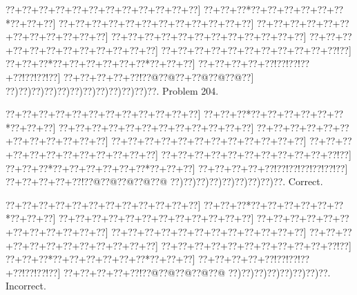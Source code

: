 \documentclass[a5paper]{article}
\begin{document}
\begin{center}
{\goo
\0??+\0??+\0??+\0??+\0??+\0??+\0??+\0??+\0??+\0??+\0??+\0??]
\0??+\0??+\0??*\0??+\0??+\0??+\0??+\0??+\0??*\0??+\0??+\0??]
\0??+\0??+\0??+\0??+\0??+\0??+\0??+\0??+\0??+\0??+\0??+\0??]
\0??+\0??+\0??+\0??+\0??+\0??+\0??+\0??+\0??+\0??+\0??+\0??]
\0??+\0??+\0??+\0??+\0??+\0??+\0??+\0??+\0??+\0??+\0??+\0??]
\0??+\0??+\0??+\0??+\0??+\0??+\0??+\0??+\0??+\0??+\0??+\0??]
\0??+\0??+\0??+\0??+\0??+\0??+\0??+\0??+\0??+\0??+\0??!\0??]
\0??+\0??+\0??*\0??+\0??+\0??+\0??+\0??+\0??*\0??+\0??+\0??]
\0??+\0??+\0??+\0??+\0??!\0??!\0??!\0??+\0??!\0??!\0??!\0??]
\0??+\0??+\0??+\0??+\0??!\0??@\0??@\0??+\0??@\0??@\0??@\0??]
\0??)\0??)\0??)\0??)\0??)\0??)\0??)\0??)\0??)\0??)\0??)\0??.
}
Problem 204.

\end{center}
\begin{center}
{\goo
\0??+\0??+\0??+\0??+\0??+\0??+\0??+\0??+\0??+\0??+\0??+\0??]
\0??+\0??+\0??*\0??+\0??+\0??+\0??+\0??+\0??*\0??+\0??+\0??]
\0??+\0??+\0??+\0??+\0??+\0??+\0??+\0??+\0??+\0??+\0??+\0??]
\0??+\0??+\0??+\0??+\0??+\0??+\0??+\0??+\0??+\0??+\0??+\0??]
\0??+\0??+\0??+\0??+\0??+\0??+\0??+\0??+\0??+\0??+\0??+\0??]
\0??+\0??+\0??+\0??+\0??+\0??+\0??+\0??+\0??+\0??+\0??+\0??]
\0??+\0??+\0??+\0??+\0??+\0??+\0??+\0??+\0??+\0??+\0??!\0??]
\0??+\0??+\0??*\0??+\0??+\0??+\0??+\0??+\0??*\0??+\0??+\0??]
\0??+\0??+\0??+\0??+\0??!\0??!\0??!\0??!\0??!\0??!\0??]
\0??+\0??+\0??+\0??+\0??!\0??@\0??@\0??@\0??@\0??@
\0??)\0??)\0??)\0??)\0??)\0??)\0??)\0??)\0??.
}
Correct. 

\end{center}
\begin{center}
{\goo
\0??+\0??+\0??+\0??+\0??+\0??+\0??+\0??+\0??+\0??+\0??+\0??]
\0??+\0??+\0??*\0??+\0??+\0??+\0??+\0??+\0??*\0??+\0??+\0??]
\0??+\0??+\0??+\0??+\0??+\0??+\0??+\0??+\0??+\0??+\0??+\0??]
\0??+\0??+\0??+\0??+\0??+\0??+\0??+\0??+\0??+\0??+\0??+\0??]
\0??+\0??+\0??+\0??+\0??+\0??+\0??+\0??+\0??+\0??+\0??+\0??]
\0??+\0??+\0??+\0??+\0??+\0??+\0??+\0??+\0??+\0??+\0??+\0??]
\0??+\0??+\0??+\0??+\0??+\0??+\0??+\0??+\0??+\0??+\0??!\0??]
\0??+\0??+\0??*\0??+\0??+\0??+\0??+\0??+\0??*\0??+\0??+\0??]
\0??+\0??+\0??+\0??+\0??!\0??!\0??!\0??+\0??!\0??!\0??!\0??]
\0??+\0??+\0??+\0??+\0??!\0??@\0??@\0??@\0??@\0??@
\0??)\0??)\0??)\0??)\0??)\0??)\0??)\0??.
}
Incorrect. 

\end{center}
\newpage
\end{document}

